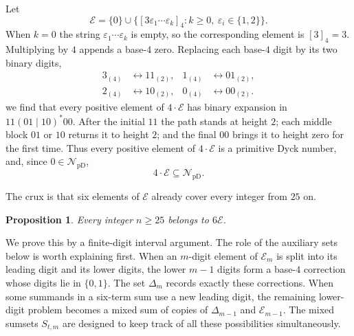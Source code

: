 \documentclass[12pt]{article}
\theoremstyle{plain}
\newtheorem{proposition}[theorem]{Proposition}
\newcommand{\val}[2]{[#1]_{#2}}
\newcommand{\NpD}{\mathcal{N}_{\mathrm{pD}}}
\begin{document}
Let
\[
 \mathcal E=\{0\}\cup
 \bigl\{\val{3\varepsilon_1\cdots\varepsilon_k}{4}:
        k\geq0,\ \varepsilon_i\in\{1,2\}\bigr\}.
\]
When $k=0$ the string $\varepsilon_1\cdots\varepsilon_k$ is empty, so
the corresponding element is $\val{3}{4}=3$.  Multiplying by $4$ appends
a base-$4$ zero.  Replacing each base-$4$ digit by its two binary digits,
\[
\begin{aligned}
 3_{(4)}&\longleftrightarrow11_{(2)},&
 1_{(4)}&\longleftrightarrow01_{(2)},\\
 2_{(4)}&\longleftrightarrow10_{(2)},&
 0_{(4)}&\longleftrightarrow00_{(2)}.
\end{aligned}
\]
we find that every positive element of $4\cdot\mathcal E$ has binary
expansion in $11(01\mid10)^*00$.  After the initial $11$ the path stands
at height $2$; each middle block $01$ or $10$ returns it to height $2$;
and the final $00$ brings it to height zero for the first time.  Thus
every positive element of $4\cdot\mathcal E$ is a primitive Dyck number,
and, since $0\in\NpD$,
\begin{equation}\label{eq:4E}
        4\cdot\mathcal E\subseteq\NpD.
\end{equation}

The crux is that six elements of $\mathcal E$ already cover every integer
from $25$ on.

\begin{proposition}\label{prop:E}
Every integer $n\geq25$ belongs to $6\mathcal E$.
\end{proposition}

We prove this by a finite-digit interval argument.  The role of the
auxiliary sets below is worth explaining first.  When an $m$-digit element
of $\mathcal E_m$ is split into its leading digit and its lower digits, the
lower $m-1$ digits form a base-$4$ correction whose digits lie in
$\{0,1\}$.  The set $\Delta_m$ records exactly these corrections.  When
some summands in a six-term sum use a new leading digit, the remaining
lower-digit problem becomes a mixed sum of copies of $\Delta_{m-1}$ and
$\mathcal E_{m-1}$.  The mixed sumsets $S_{t,m}$ are designed to keep
track of all these possibilities simultaneously.
\end{document}
